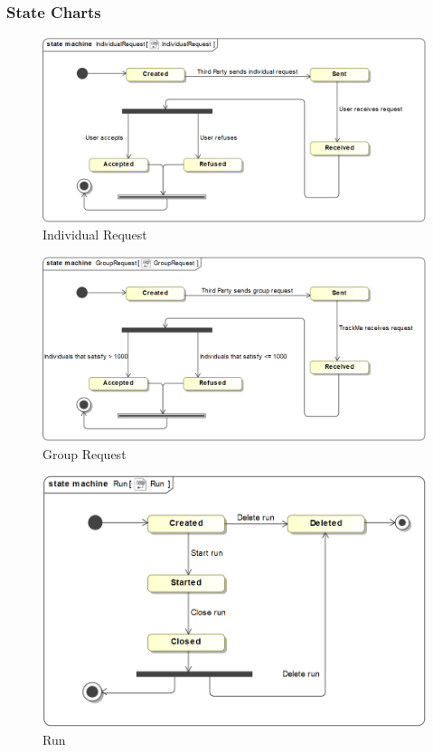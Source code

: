 \documentclass[a4paper]{article}
\begin{document}
    \subsubsection{State Charts}
    \begin{figure}[!ht]
        \centering
        \includegraphics[width=\textwidth, keepaspectratio]{images/UML/state_individualRequest.png}
        \caption{Individual Request}
        \label{fig:state_individual}
    \end{figure}
    \begin{figure}[!ht]
        \centering
        \includegraphics[width=\textwidth, keepaspectratio]{images/UML/state_groupRequest.png}
        \caption{Group Request}
        \label{fig:state_group}
    \end{figure}
    \begin{figure}[!ht]
        \centering
        \includegraphics[width=\textwidth, keepaspectratio]{images/UML/state_run.png}
        \caption{Run}
        \label{fig:state_run}
    \end{figure}
\end{document}
